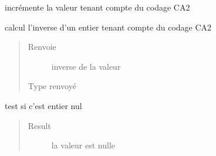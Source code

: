 \documentclass[letterpaper,10pt,french]{sphinxmanual}
\begin{document}
\begin{fulllineitems}
\begin{fulllineitems}
\label{\detokenize{executeurcomponents:executeurcomponents.DataValue.inc}}
incrémente la valeur tenant compte du codage CA2

\end{fulllineitems}


\begin{fulllineitems}
\label{\detokenize{executeurcomponents:executeurcomponents.DataValue.intValue}}
\end{fulllineitems}


\begin{fulllineitems}
\label{\detokenize{executeurcomponents:executeurcomponents.DataValue.inverse}}
calcul l’inverse d’un entier tenant compte du codage CA2
\begin{quote}\begin{description}
\item[{Renvoie}] \leavevmode
inverse de la valeur

\item[{Type renvoyé}] \leavevmode
{\hyperref[\detokenize{executeurcomponents:executeurcomponents.DataValue}]{}}

\end{description}\end{quote}

\end{fulllineitems}


\begin{fulllineitems}
\label{\detokenize{executeurcomponents:executeurcomponents.DataValue.isNul}}
test si c’est entier nul
\begin{quote}\begin{description}
\item[{Result}] \leavevmode
la valeur est nulle


\end{description}
\end{quote}
\end{fulllineitems}
\end{fulllineitems}
\end{document}
